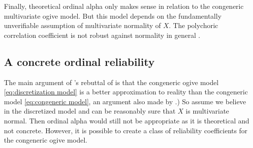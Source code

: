 \documentclass[twoside]{article}
\begin{document}
Finally, theoretical ordinal alpha only makes sense in relation to
the congeneric multivariate ogive model. But this model depends on
the fundamentally unverifiable assumption of multivariate normality
of $X$. The polychoric correlation coefficient is not robust against
normality in general \citep{Foldnes2019-yd}. 

\subsection{A concrete ordinal reliability}

The main argument of \citet{Zumbo2019-lm}'s rebuttal of \citep{Chalmers2018-fj}
is that the congeneric ogive model \eqref{eq:discretization model} 
is a better approximation to reality than the congeneric model \eqref{eq:congeneric model}, an argument also made by \citet[][p.2]{Gadermann2012-jl}.)
So assume we believe in the discretized model and can be reasonably
sure that $X$ is multivariate normal. Then ordinal alpha would still
not be appropriate as it is theoretical and not concrete. However,
it is possible to create a class of reliability coefficients for the
congeneric ogive model.
\end{document}
